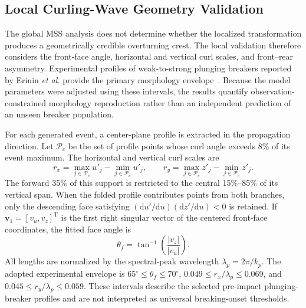 \subsection{Local Curling-Wave Geometry Validation}
\label{subsec:local_curl_geometry_validation}

The global MSS analysis does not determine whether the localized transformation produces a geometrically credible overturning crest. The local validation therefore considers the front-face angle, horizontal and vertical curl scales, and front--rear asymmetry. Experimental profiles of weak-to-strong plunging breakers reported by Erinin \emph{et al.} provide the primary morphology envelope~\cite{erinin2023plunging}. Because the model parameters were adjusted using these intervals, the results quantify observation-constrained morphology reproduction rather than an independent prediction of an unseen breaker population.

For each generated event, a center-plane profile is extracted in the propagation direction. Let $\mathcal{P}_c$ be the set of profile points whose curl angle exceeds 8\% of its event maximum. The horizontal and vertical curl scales are
\begin{equation}
r_x=\max_{j\in\mathcal{P}_c}u'_j-\min_{j\in\mathcal{P}_c}u'_j,\qquad r_y=\max_{j\in\mathcal{P}_c}z'_j-\min_{j\in\mathcal{P}_c}z'_j.
\label{eq:curl_scale_metrics}
\end{equation}
The forward 35\% of this support is restricted to the central 15\%--85\% of its vertical span. When the folded profile contributes points from both branches, only the descending face satisfying $(\mathrm{d}u'/\mathrm{d}u)(\mathrm{d}z'/\mathrm{d}u)<0$ is retained. If $\boldsymbol{v}_1=[v_u,v_z]^{\mathrm{T}}$ is the first right singular vector of the centered front-face coordinates, the fitted face angle is
\begin{equation}
\theta_f=\tan^{-1}\left(\frac{|v_z|}{|v_u|}\right).
\label{eq:front_face_angle_metric}
\end{equation}
All lengths are normalized by the spectral-peak wavelength $\lambda_p=2\pi/k_p$. The adopted experimental envelope is $65^{\circ}\leq\theta_f\leq70^{\circ}$, $0.049\leq r_x/\lambda_p\leq0.069$, and $0.045\leq r_y/\lambda_p\leq0.059$. These intervals describe the selected pre-impact plunging-breaker profiles and are not interpreted as universal breaking-onset thresholds.

